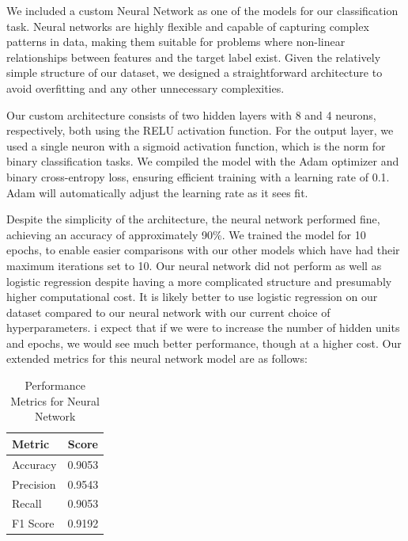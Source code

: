 \documentclass[manuscript,screen,review, nonacm]{acmart}
\begin{document}
We included a custom Neural Network as one of the models for our classification task. 
Neural networks are highly flexible and capable of capturing complex patterns in data, 
making them suitable for problems where non-linear relationships between features and the 
target label exist. Given the relatively simple structure of our dataset, we designed a 
straightforward architecture to avoid overfitting and any other unnecessary complexities.

Our custom architecture consists of two hidden layers with 8 and 4 neurons, respectively, 
both using the RELU activation function. For the output layer, we used a single neuron with 
a sigmoid activation function, which is the norm for binary classification tasks. We compiled 
the model with the Adam optimizer and binary cross-entropy loss, ensuring efficient training 
with a learning rate of 0.1. Adam will automatically adjust the learning rate as it sees fit.

Despite the simplicity of the architecture, the neural network performed fine, achieving 
an accuracy of approximately 90\%. We trained the model for 10 epochs, to enable easier 
comparisons with our other models which have had their maximum iterations set to 10. Our neural
network did not perform as well as logistic regression despite having a more complicated
structure and presumably higher computational cost. It is likely better to use logistic regression
on our dataset compared to our neural network with our current choice of hyperparameters.
i expect that if we were to increase the number of hidden units and epochs, we would see much better
performance, though at a higher cost. Our extended metrics for this neural 
network model are as follows:

\begin{table}[H]
    \centering
    \begin{tabular}{@{}lc@{}}
        \toprule
        \textbf{Metric} & \textbf{Score} \\ \midrule
        Accuracy  & 0.9053 \\
        Precision & 0.9543 \\
        Recall    & 0.9053 \\
        F1 Score  & 0.9192 \\ \bottomrule
    \end{tabular}
    \caption{Performance Metrics for Neural Network}
\end{table}
\end{document}
